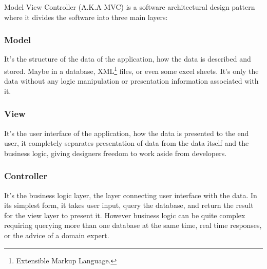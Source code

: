 Model View Controller (A.K.A MVC) is a software architectural design pattern where it divides the software into three main layers:\cite{mvc_what}
\subsubsection{Model}
	It's the structure of the data of the application, how the data is described and stored. Maybe in a database, XML\footnote{Extensible Markup Language.} files, or even some excel sheets. It's only the data without any logic manipulation or presentation information associated with it.

\subsubsection{View}
	It's the user interface of the application, how the data is presented to the end user, it completely separates presentation of data from the data itself and the business logic, giving designers freedom to work aside from developers.

\subsubsection{Controller}
	It's the business logic layer, the layer connecting user interface with the data. In its simplest form, it takes user input, query the database, and return the result for the view layer to present it. However business logic can be quite complex requiring querying more than one database at the same time, real time responses, or the advice of a domain expert.